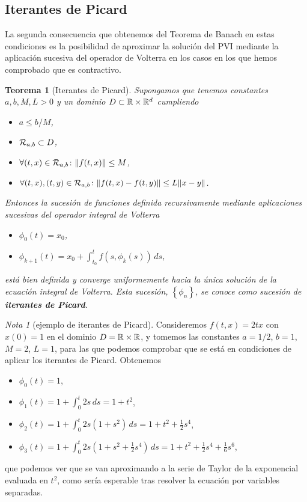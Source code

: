 \documentclass[11pt]{article}
\theoremstyle{plain}
\newtheorem{theorem}{Teorema}
\theoremstyle{definition}
\theoremstyle{remark}
\newtheorem{remark}{Nota}
\begin{document}
\subsection{Iterantes de Picard}

La segunda consecuencia que obtenemos del Teorema de Banach en estas
condiciones es la posibilidad de aproximar la solución del PVI
mediante la aplicación sucesiva del operador de Volterra en los casos
en los que hemos comprobado que es contractivo.

\begin{theorem}[Iterantes de Picard]
  Supongamos que tenemos constantes \(a,b,M,L > 0\) y un dominio \(D \subset \mathbb{R} \times \mathbb{R}^d\)
  cumpliendo
  \begin{itemize}
    \item \(a \leq b/M\),
    \item \({{\cal{R}}}_{a,b} \subset D\),
    \item \(\forall (t,x) \in {{\cal{R}}}_{a,b}\colon \|f(t,x)\| \leq M\),
    \item \(\forall (t,x),(t,y) \in {{\cal{R}}}_{a,b} \colon \|f(t,x)-f(t,y)\| \leq L \|x-y\|\).
  \end{itemize}
  Entonces la sucesión de funciones definida recursivamente mediante aplicaciones
  sucesivas del operador integral de Volterra
  \begin{itemize}
    \item \(\phi_0(t) = x_0\),
    \item \(\displaystyle \phi_{k+1}(t) = x_0 + \int_{t_0}^t f(s,\phi_k(s))\,ds\),
  \end{itemize}
  está bien definida y converge uniformemente hacia la única solución
  de la ecuación integral de Volterra. Esta sucesión, \(\left\{ \phi_n \right\}\), se conoce
  como sucesión de \textbf{iterantes de Picard}.
\end{theorem}

\begin{remark}[ejemplo de iterantes de Picard]
  Consideremos $f(t,x) = 2tx$ con $x(0) = 1$ en el dominio $D = \mathbb{R}\times\mathbb{R}$, y tomemos
  las constantes $a = 1/2$, $b=1$, $M=2$, $L=1$, para las que
  podemos comprobar que se está en condiciones de aplicar los
  iterantes de Picard. Obtenemos
  \begin{itemize}
  \item $\phi_0(t) = 1$,
  \item $\displaystyle\phi_1(t) = 1 + \int_{0}^t 2s\,ds = 1 + t^2$,
  \item $\displaystyle\phi_2(t) = 1 + \int_{0}^t 2s(1 + s^2) \,ds = 1 + t^2 + \frac{1}{2}s^4$,
  \item $\displaystyle\phi_3(t) = 1 + \int_{0}^t 2s(1 + s^2 + \frac{1}{2}s^4) \,ds = 1 + t^2 + \frac{1}{2}s^4 + \frac{1}{6} s^6$,
  \end{itemize}
  que podemos ver que se van aproximando a la serie de Taylor de
  la exponencial evaluada en $t^2$, como sería esperable tras
  resolver la ecuación por variables separadas.
\end{remark}
\end{document}
